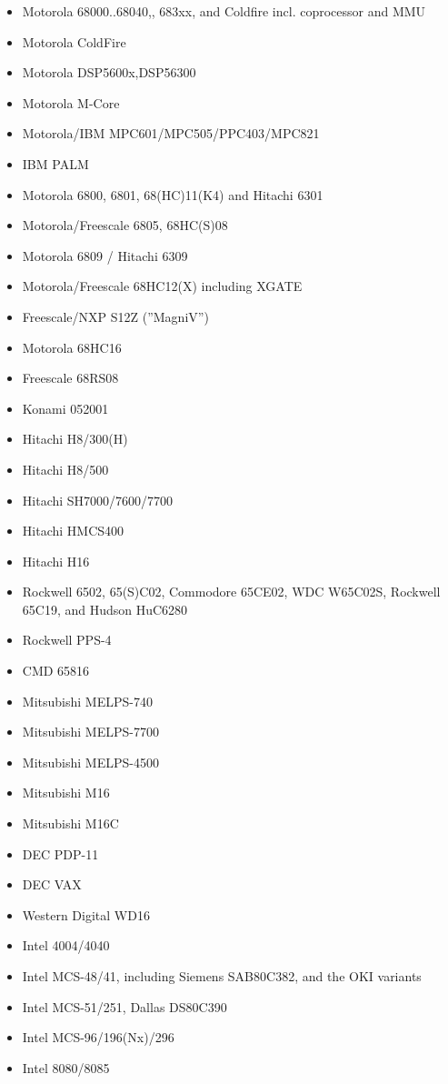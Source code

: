 \documentclass[12pt,twoside]{report}
\begin{document}
\begin{itemize}
\item{Motorola 68000..68040,, 683xx, and Coldfire incl. coprocessor and MMU}
\item{Motorola ColdFire}
\item{Motorola DSP5600x,DSP56300}\item{Motorola M-Core}
\item{Motorola/IBM MPC601/MPC505/PPC403/MPC821}
\item{IBM PALM}
\item{Motorola 6800, 6801, 68(HC)11(K4) and Hitachi 6301}
\item{Motorola/Freescale 6805, 68HC(S)08}
\item{Motorola 6809 / Hitachi 6309}
\item{Motorola/Freescale 68HC12(X) including XGATE}
\item{Freescale/NXP S12Z (''MagniV'')}
\item{Motorola 68HC16}
\item{Freescale 68RS08}
\item{Konami 052001}
\item{Hitachi H8/300(H)}
\item{Hitachi H8/500}
\item{Hitachi SH7000/7600/7700}
\item{Hitachi HMCS400}
\item{Hitachi H16}
\item{Rockwell 6502, 65(S)C02, Commodore 65CE02, WDC W65C02S, Rockwell 65C19, and
      Hudson HuC6280}
\item{Rockwell PPS-4}
\item{CMD 65816}
\item{Mitsubishi MELPS-740}
\item{Mitsubishi MELPS-7700}
\item{Mitsubishi MELPS-4500}
\item{Mitsubishi M16}
\item{Mitsubishi M16C}
\item{DEC PDP-11}
\item{DEC VAX}
\item{Western Digital WD16}
\item{Intel 4004/4040}
\item{Intel MCS-48/41, including Siemens SAB80C382, and the OKI
      variants}
\item{Intel MCS-51/251, Dallas DS80C390}
\item{Intel MCS-96/196(Nx)/296}
\item{Intel 8080/8085}

\end{itemize}
\end{document}
